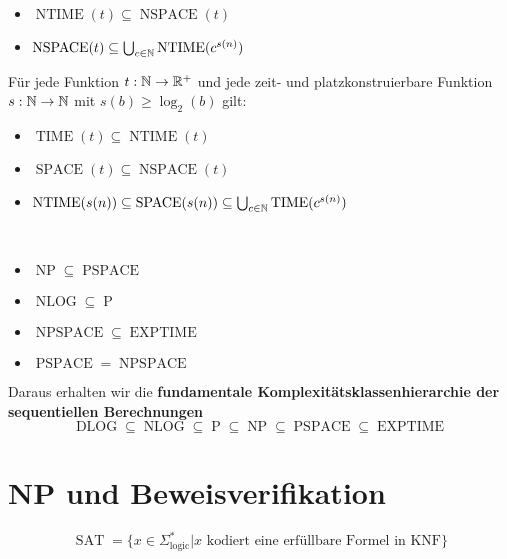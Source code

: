 \begin{lemma}
\begin{itemize}
  \item \(\operatorname{NTIME}(t) \subseteq \operatorname{NSPACE}(t) \)
  \item \(\operatorname{NSPACE}(t) \subseteq \bigcup_{c \in \mathbb{N}} \operatorname{NTIME}(c^{s(n)}) \)\\
\end{itemize}
\end{lemma}

\begin{satz}
Für jede Funktion \(t: \mathbb{N} \to \mathbb{R}^+\) und jede zeit- und platzkonstruierbare Funktion \(s: \mathbb{N} \to \mathbb{N}\) mit \(s(b) \geq \log_2(b)\) gilt:
\begin{itemize}
  \item \(\operatorname{TIME}(t) \subseteq \operatorname{NTIME}(t)\)
  \item \(\operatorname{SPACE}(t) \subseteq \operatorname{NSPACE}(t)\)
  \item \(\operatorname{NTIME}(s(n)) \subseteq \operatorname{SPACE}(s(n)) \subseteq \bigcup_{c \in \mathbb{N}} \operatorname{TIME}(c^{s(n)})\)\\
\end{itemize}
\end{satz}

\begin{corollary}\ 
\begin{itemize}
  \item \(\operatorname{NP} \subseteq \operatorname{PSPACE}\)
  \item \( \operatorname{NLOG} \subseteq \operatorname{P} \)
  \item \( \operatorname{NPSPACE} \subseteq \operatorname{EXPTIME} \)
  \item \( \operatorname{PSPACE} = \operatorname{NPSPACE} \)\\
\end{itemize}
\end{corollary}

Daraus erhalten wir die \textbf{fundamentale Komplexitätsklassenhierarchie der sequentiellen Berechnungen}
\[
\operatorname{DLOG} \subseteq \operatorname{NLOG} \subseteq \operatorname{P} \subseteq \operatorname{NP} \subseteq \operatorname{PSPACE} \subseteq \operatorname{EXPTIME}
\]

\section{NP und Beweisverifikation}
\begin{definition}
\[
\operatorname{SAT} = \{ x \in \Sigma_\text{logic}^* | x \text{ kodiert eine erfüllbare Formel in KNF}\}
\]
\end{definition}

